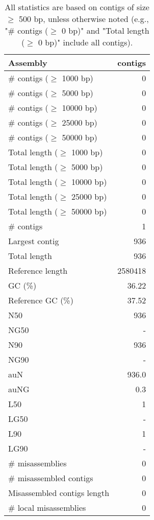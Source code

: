 \documentclass[12pt,a4paper]{article}
\begin{document}
\begin{table}[ht]
\begin{center}
\caption{All statistics are based on contigs of size $\geq$ 500 bp, unless otherwise noted (e.g., "\# contigs ($\geq$ 0 bp)" and "Total length ($\geq$ 0 bp)" include all contigs).}
\begin{tabular}{|l*{1}{|r}|}
\hline
Assembly & contigs \\ \hline
\# contigs ($\geq$ 1000 bp) & 0 \\ \hline
\# contigs ($\geq$ 5000 bp) & 0 \\ \hline
\# contigs ($\geq$ 10000 bp) & 0 \\ \hline
\# contigs ($\geq$ 25000 bp) & 0 \\ \hline
\# contigs ($\geq$ 50000 bp) & 0 \\ \hline
Total length ($\geq$ 1000 bp) & 0 \\ \hline
Total length ($\geq$ 5000 bp) & 0 \\ \hline
Total length ($\geq$ 10000 bp) & 0 \\ \hline
Total length ($\geq$ 25000 bp) & 0 \\ \hline
Total length ($\geq$ 50000 bp) & 0 \\ \hline
\# contigs & 1 \\ \hline
Largest contig & 936 \\ \hline
Total length & 936 \\ \hline
Reference length & 2580418 \\ \hline
GC (\%) & 36.22 \\ \hline
Reference GC (\%) & 37.52 \\ \hline
N50 & 936 \\ \hline
NG50 & - \\ \hline
N90 & 936 \\ \hline
NG90 & - \\ \hline
auN & 936.0 \\ \hline
auNG & 0.3 \\ \hline
L50 & 1 \\ \hline
LG50 & - \\ \hline
L90 & 1 \\ \hline
LG90 & - \\ \hline
\# misassemblies & 0 \\ \hline
\# misassembled contigs & 0 \\ \hline
Misassembled contigs length & 0 \\ \hline
\# local misassemblies & 0 \\ \hline

\end{tabular}
\end{center}
\end{table}
\end{document}
